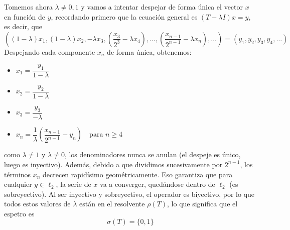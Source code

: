 \begin{ejercicio}
\begin{description}
        \noindent
        Tomemos ahora $\lambda\neq0,1$ y vamos a intentar despejar de forma única el vector $x$ en función de $y$, recordando primero que la ecuación general es $(T - \lambda I)x = y$, es decir, que
        \begin{equation*}
            \left( \left(1 - \lambda\right)x_1, \left(1 - \lambda\right)x_2, -\lambda x_3, \left(\frac{x_{3}}{2^{3}} - \lambda x_4\right), \dots, \left(\frac{x_{n-1}}{2^{n-1}} - \lambda x_n\right), \dots \right) = (y_1, y_2, y_3, y_4, \dots)
        \end{equation*}
        Despejando cada componente $x_n$ de forma única, obtenemos:
        \begin{itemize}
            \item $x_1 = \dfrac{y_1}{1 - \lambda}$
            \item $x_2 = \dfrac{y_2}{1 - \lambda}$
            \item $x_3 = \dfrac{y_3}{-\lambda}$
            \item $x_n = \dfrac{1}{\lambda} \left( \dfrac{x_{n-1}}{2^{n-1}} - y_n \right) \quad \text{para } n \geq 4$
        \end{itemize}
        como $\lambda \neq 1$ y $\lambda \neq 0$, los denominadores nunca se anulan (el despeje es único, luego es inyectivo). Además, debido a que dividimos sucesivamente por $2^{n-1}$, los términos $x_n$ decrecen rapidísimo geométricamente. Eso garantiza que para cualquier $y \in \ell_2$, la serie de $x$ va a converger, quedándose dentro de $\ell_2$ (es sobreyectivo). Al ser inyectivo y sobreyectivo, el operador es biyectivo, por lo que todos estos valores de $\lambda$ están en el resolvente $\rho(T)$, lo que significa que el espetro es
        \begin{equation*}
            \sigma(T) = \{0,1\}
        \end{equation*}
    \end{description}
\end{ejercicio}

